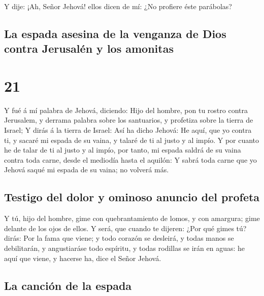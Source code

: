  Y dije: ¡Ah, Señor Jehová! ellos dicen de mí: ¿No
profiere éste parábolas?

\hypertarget{la-espada-asesina-de-la-venganza-de-dios-contra-jerusaluxe9n-y-los-amonitas}{%
\subsection{La espada asesina de la venganza de Dios contra Jerusalén y
los
amonitas}\label{la-espada-asesina-de-la-venganza-de-dios-contra-jerusaluxe9n-y-los-amonitas}}

\hypertarget{section-20}{%
\section{21}\label{section-20}}

 Y fué á mí palabra de Jehová, diciendo: 
Hijo del hombre, pon tu rostro contra Jerusalem, y derrama palabra sobre
los santuarios, y profetiza sobre la tierra de Israel;  Y
dirás á la tierra de Israel: Así ha dicho Jehová: He aquí, que yo contra
ti, y sacaré mi espada de su vaina, y talaré de ti al justo y al impío.
 Y por cuanto he de talar de ti al justo y al impío, por
tanto, mi espada saldrá de su vaina contra toda carne, desde el mediodía
hasta el aquilón:  Y sabrá toda carne que yo Jehová saqué
mi espada de su vaina; no volverá más.

\hypertarget{testigo-del-dolor-y-ominoso-anuncio-del-profeta}{%
\subsection{Testigo del dolor y ominoso anuncio del
profeta}\label{testigo-del-dolor-y-ominoso-anuncio-del-profeta}}

 Y tú, hijo del hombre, gime con quebrantamiento de lomos,
y con amargura; gime delante de los ojos de ellos.  Y
será, que cuando te dijeren: ¿Por qué gimes tú? dirás: Por la fama que
viene; y todo corazón se desleirá, y todas manos se debilitarán, y
angustiaráse todo espíritu, y todas rodillas se irán en aguas: he aquí
que viene, y hacerse ha, dice el Señor Jehová.

\hypertarget{la-canciuxf3n-de-la-espada}{%
\subsection{La canción de la espada}\label{la-canciuxf3n-de-la-espada}}

